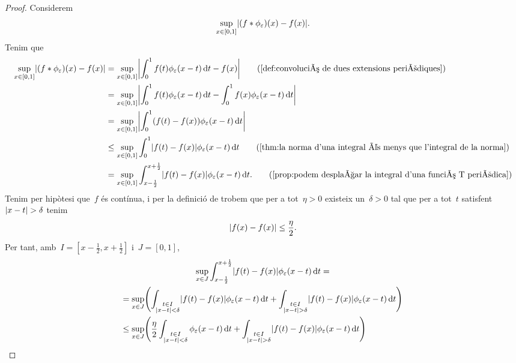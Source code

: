 \documentclass[../../main.tex]{subfiles}
\begin{document}
\begin{theorem}
\begin{proof}
            Considerem
            \[
                \sup_{x\in[0,1]}\abs{(f\convolucio\phi_{\varepsilon})(x)-f(x)}.
            \]
            Tenim que
            \begin{align*}
                \sup_{x\in[0,1]}\abs{(f\convolucio\phi_{\varepsilon})(x)-f(x)}&=\sup_{x\in[0,1]}\abs{\int_{0}^{1}f(t)\phi_{\varepsilon}(x-t)\diff t-f(x)} \tag{\ref{def:convolució de dues extensions periòdiques}} \\
                &=\sup_{x\in[0,1]}\abs{\int_{0}^{1}f(t)\phi_{\varepsilon}(x-t)\diff t-\int_{0}^{1}f(x)\phi_{\varepsilon}(x-t)\diff t} \\
                &=\sup_{x\in[0,1]}\abs{\int_{0}^{1}(f(t)-f(x))\phi_{\varepsilon}(x-t)\diff t} \\
                &\leq\sup_{x\in[0,1]}\int_{0}^{1}\abs{f(t)-f(x)}\phi_{\varepsilon}(x-t)\diff t \tag{\ref{thm:la norma d'una integral és menys que l'integral de la norma}} \\
                &=\sup_{x\in[0,1]}\int_{x-\frac{1}{2}}^{x+\frac{1}{2}}\abs{f(t)-f(x)}\phi_{\varepsilon}(x-t)\diff t.
                \tag{\ref{prop:podem desplaçar la integral d'una funció T periòdica}}
            \end{align*}
             Tenim per hipòtesi que~\(f\) és contínua, i per la definició de  trobem que per a tot~\(\eta>0\) existeix un~\(\delta>0\) tal que per a tot~\(t\) satisfent~\(\abs{x-t}>\delta\) tenim
             \[
                 \abs{f(x)-f(x)}\leq\frac{\eta}{2}.
             \]
             Per tant, amb~\(I=[x-\frac{1}{2},x+\frac{1}{2}]\) i~\(J=[0,1]\), %
             \begin{multline*}
                 \sup_{x\in J}\int_{x-\frac{1}{2}}^{x+\frac{1}{2}}\abs{f(t)-f(x)}\phi_{\varepsilon}(x-t)\diff t = \\
                 =\sup_{x\in J}\left(\int_{\substack{t\in I\\\abs{x-t}<\delta}}\abs{f(t)-f(x)}\phi_{\varepsilon}(x-t)\diff t+\int_{\substack{t\in I\\\abs{x-t}>\delta}}\abs{f(t)-f(x)}\phi_{\varepsilon}(x-t)\diff t\right) \hfill\\
                 \leq\sup_{x\in J}\left(\frac{\eta}{2}\int_{\substack{t\in I\\\abs{x-t}<\delta}}\phi_{\varepsilon}(x-t)\diff t+\int_{\substack{t\in I\\\abs{x-t}>\delta}}\abs{f(t)-f(x)}\phi_{\varepsilon}(x-t)\diff t\right) \hfill\\

\end{multline*}
\end{proof}
\end{theorem}
\end{document}
